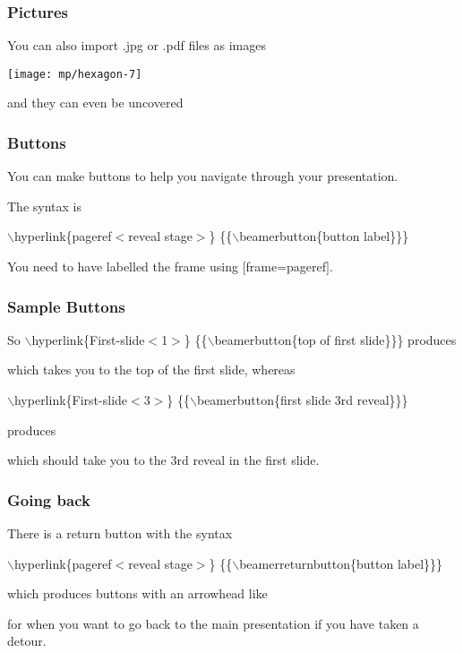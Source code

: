 \documentclass[]%
{beamer}
\begin{document}
\begin{frame}
\frametitle{Pictures}

You can also import .jpg or .pdf files as images

\medskip
\begin{center}
\texttt{[image: mp/hexagon-7]}
\end{center}

\pause
and they can even be uncovered



\end{frame}

\begin{frame}[label=buttons]
\frametitle{Buttons}

\bigskip
You can make buttons to help you navigate through your presentation.

\bigskip
The syntax is

\bigskip
$\backslash$hyperlink\{pageref$<$reveal stage$>$\}%
\{\{$\backslash$beamerbutton\{button label\}\}\}

\bigskip
You need to have labelled the frame using
$[$frame=pageref$]$.

\end{frame}

\begin{frame}[label=sample buttons]
\frametitle{Sample Buttons}

So $\backslash$hyperlink\{First-slide$<$1$>$\}%
\{\{$\backslash$beamerbutton\{top of first slide\}\}\}
produces

\bigskip
\hyperlink{First-slide<1>}{{}}
\bigskip

which takes you to the top of the first slide,
\pause
whereas

\bigskip
$\backslash$hyperlink\{First-slide$<$3$>$\}%
\{\{$\backslash$beamerbutton\{first slide 3rd reveal\}\}\}

produces

\bigskip
\hyperlink{First-slide<3>}{{}}
\bigskip

which should take you to the 3rd reveal in the first slide.

\end{frame}

\begin{frame}
\frametitle{Going back}

There is a return button with the syntax

\bigskip
{\small
$\backslash$hyperlink\{pageref$<$reveal stage$>$\}%
\{\{$\backslash$beamerreturnbutton\{button label\}\}\}
}

\bigskip
which produces buttons with an arrowhead like
\hfill\hyperlink{buttons<1>}{}

for when you want to go back to the main presentation if you have taken a detour.
\end{frame}
\end{document}
